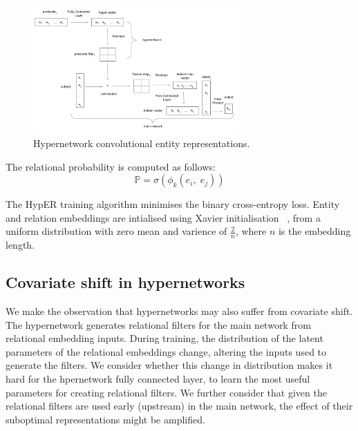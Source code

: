 \begin{figure}[H]
   	\centering
    	\includegraphics[width=0.7\textwidth, height=0.5\textwidth]{hyper_neural_tensor_network_final}
	\caption{Hypernetwork convolutional entity representations.}
\end{figure}

\noindent The relational probability is computed as follows: 
\begin{equation}
	\mathbb{P} = \sigma(\phi_k(e_i, \; e_j)) 
\end{equation}

\noindent The HypER training algorithm minimises the binary cross-entropy loss. Entity and relation embeddings are intialised using Xavier initialisation \unskip ~\citep{glorot2010understanding}, from a uniform distribution with zero mean and varience of $ \frac{2}{n} $, where $ n $ is the embedding length. \par

\subsection{Covariate shift in hypernetworks}

We make the observation that hypernetworks may also suffer from covariate shift. The hypernetwork generates relational filters for the main network from relational embedding inputs. During training, the distribution of the latent parameters of the relational embeddings change, altering the inputs used to generate the filters. We consider whether this change in distribution makes it hard for the hpernetwork fully connected layer, to learn the most useful parameters for creating relational filters. We further consider that given the relational filters are used early (upstream) in the main network, the effect of their suboptimal representations might be amplified. \par

